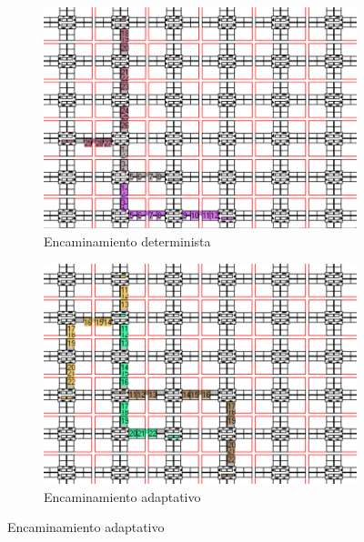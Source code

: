 \begin{itemize}
\begin{figure}[hbt]
  \centering
  \begin{subfigure}{0.48\textwidth}
    \includegraphics[width=\linewidth]{figs/congestion-simured.png}
    \caption{Encaminamiento determinista}
  \end{subfigure}
  \hspace{0.25cm}
  \begin{subfigure}{0.48\textwidth}
    \includegraphics[width=\linewidth]{figs/adaptativo-simured.png}
    \caption{Encaminamiento adaptativo}
  \end{subfigure}
  
  \vspace{1cm} %
  

\end{figure}
\end{itemize}
